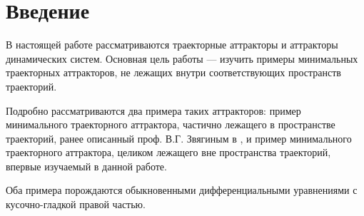 \chapter*{Введение}
В настоящей работе рассматриваются траекторные аттракторы и аттракторы динамических систем.
Основная цель работы --- изучить примеры минимальных траекторных аттракторов,
не лежащих внутри соответствующих пространств траекторий.

Подробно рассматриваются два примера таких аттракторов: пример минимального траекторного аттрактора,
частично лежащего в пространстве траекторий, ранее описанный проф. В.Г. Звягиным в \cite{Zelenaya},
и пример минимального траекторного аттрактора, целиком лежащего вне пространства траекторий,
впервые изучаемый в данной работе.

Оба примера порождаются обыкновенными дифференциальными уравнениями с кусочно-гладкой правой частью.
